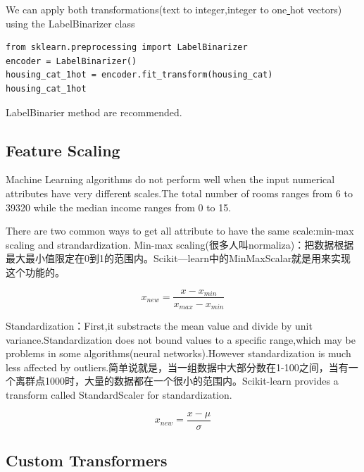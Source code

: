 \documentclass[UTF8]{ctexart}
\begin{document}
We can apply both transformations(text to integer,integer to one\underline{ }hot vectors) using the LabelBinarizer class

\begin{lstlisting}
from sklearn.preprocessing import LabelBinarizer
encoder = LabelBinarizer()
housing_cat_1hot = encoder.fit_transform(housing_cat)
housing_cat_1hot
\end{lstlisting}
LabelBinarier method are recommended.

\subsection{Feature Scaling}

Machine Learning algorithms do not perform well when the input numerical attributes have very different scales.The total number of rooms ranges from 6 to 39320 while the median income ranges from 0 to 15.

There are two common ways to get all attribute to have the same scale:min-max scaling and strandardization.
Min-max scaling(很多人叫normaliza)：把数据根据最大最小值限定在0到1的范围内。Scikit—learn中的MinMaxScalar就是用来实现这个功能的。

\begin{equation}
x_{new} = \frac{x-x_{min}}{x_{max}-x_{min}}
\end{equation}

Standardization：First,it substracts the mean value and divide by unit variance.Standardization does not bound values to a specific range,which may be problems in some algorithms(neural networks).However standardization is much less affected by outliers.简单说就是，当一组数据中大部分数在1-100之间，当有一个离群点1000时，大量的数据都在一个很小的范围内。Scikit-learn provides a transform called StandardScaler for standardization.

\begin{equation}
x_{new}  = \frac{x-\mu}{\sigma}
\end{equation}

\subsection{Custom Transformers}
\end{document}

